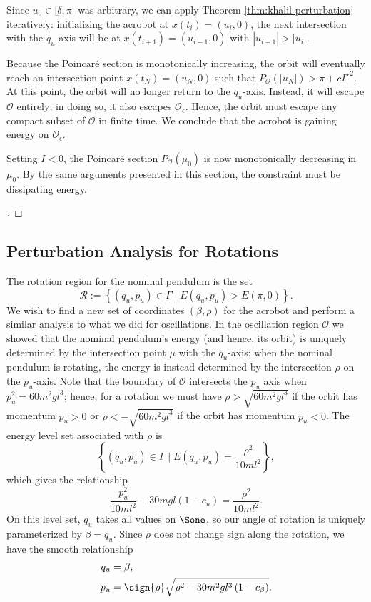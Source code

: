 Since \(u_0 \in [\underbar{\delta},\pi[\) was arbitrary, 
we can apply Theorem \ref{thm:khalil-perturbation} iteratively:
initializing the acrobot at \(x(t_i) = (u_i, 0)\), the
next intersection with the \(q_u\) axis will be at
\(x(t_{i+1}) = (u_{i+1},0)\) with \(|u_{i+1}| > |u_i|\).

Because the Poincar\'{e} section is monotonically increasing, 
the orbit will eventually reach an intersection point \(x(t_N) = (u_N,0)\)
such that \(P_\mathcal{O}(|u_N|) > \pi + c{I^\star}^2\). 
At this point, the orbit will no longer return to the
\(q_u\)-axis.
Instead, it will escape \(\mathcal{O}\) entirely; 
in doing so, it also escapes \(\mathcal{O}_\epsilon\).
Hence, the orbit must escape any compact subset of \(\mathcal{O}\) in finite
time. 
We conclude that the acrobot is gaining energy on \(\mathcal{O}_\epsilon\).

Setting \(I < 0\), the Poincar\'{e} section \(P_\mathcal{O}(\mu_0)\) is now
monotonically decreasing in \(\mu_0\).
By the same arguments presented in this section, the constraint 
must be dissipating energy.

\begin{proof}[\unskip\nopunct]
\end{proof}

\subsection*{Perturbation Analysis for Rotations}
The rotation region for the nominal pendulum is the set
\[
    \mathcal{R} := \left\{ (q_u,p_u) \in \Gamma \mid E(q_u,p_u) > E(\pi,0)\right\}
    .
\]
We wish to find a new set of coordinates \((\beta,\rho)\) for the acrobot
and perform a similar analysis to what we did for oscillations.
In the oscillation region \(\mathcal{O}\) we showed that the nominal pendulum's
energy (and hence, its orbit) is uniquely determined by the intersection point
\(\mu\) with the \(q_u\)-axis; 
when the nominal pendulum is rotating, the energy is instead determined by the
intersection \(\rho\) on the \(p_u\)-axis.
Note that the boundary of \(\mathcal{O}\) intersects the \(p_u\) axis when 
\(p_u^2 = 60m^2 g l^3\); 
hence, for a rotation we must have \(\rho > \sqrt{60 m^2 g l^3}\) if the
orbit has momentum \(p_u > 0\) 
or \(\rho < -\sqrt{60 m^2 g l^3}\) if the orbit has momentum \(p_u < 0\).
The energy level set associated with \(\rho\) is
\[
    \left\{(q_u,p_u) \in \Gamma \mid E(q_u,p_u) = \frac{\rho^2}{10ml^2}\right\}
    ,
\]
which gives the relationship
\begin{equation}\label{eqn:rotation-pu2}
    \frac{p_u^2}{10m l^2} + 30mgl(1 - c_u) = \frac{\rho^2}{10 ml^2}
    .
\end{equation}
On this level set, \(q_u\) takes all values on \(\Sone\), so our angle of
rotation is uniquely parameterized by \(\beta = q_u\).
Since \(\rho\) does not change sign along the rotation, we have the smooth
relationship
\begin{align}\label{eqn:rotation-Tinv}
    q_u &= \beta
    , \\
    p_u &= \sign{\rho}\sqrt{\rho^2 - 30 m^2 g l^3\left(1 - c_\beta \right)}
    .
\end{align}

